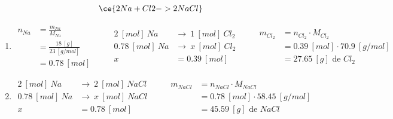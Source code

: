 \documentclass[
  11pt,
  french,
  a4paper,
  openany]{book}
\begin{document}
\begin{Answer}

\[ \ce{2 Na + Cl2 -> 2 NaCl} \]

\begin{enumerate}
\def\labelenumi{\arabic{enumi}.}
\item
  \[ \begin{split}
    n_{Na} &= \frac{m_{Na}}{M_{Na}} \\
    &= \frac{18\ [g]}{23\ [g/mol]} \\
    &= 0.78\ [mol]
    \end{split}
    \qquad
    \begin{split}
    2\ [mol]\ Na &\rightarrow\ 1\ [mol]\ Cl_2 \\
    0.78\ [mol]\ Na &\rightarrow\ x\ [mol]\ Cl_2 \\
    x &= 0.39\ [mol]
    \end{split}
    \qquad
    \begin{split}
    m_{Cl_{2}} &= n_{Cl_{2}} \cdot M_{Cl_{2}} \\
    &= 0.39\ [mol] \cdot 70.9\ [g/mol] \\
    &= 27.65\ [g] \text{ de } Cl_2
    \end{split} \]
\item
  \[ \begin{split}
    2\ [mol]\ Na &\rightarrow\ 2\ [mol]\ NaCl \\
    0.78\ [mol]\ Na &\rightarrow\ x\ [mol]\ NaCl \\
    x &= 0.78\ [mol]
    \end{split}
    \qquad
    \begin{split}
    m_{NaCl} &= n_{NaCl} \cdot M_{NaCl} \\
    &= 0.78\ [mol] \cdot 58.45\ [g/mol] \\
    &= 45.59\ [g] \text{ de } NaCl
    \end{split} \]
\end{enumerate}


\end{Answer}

\newpage
\end{document}
